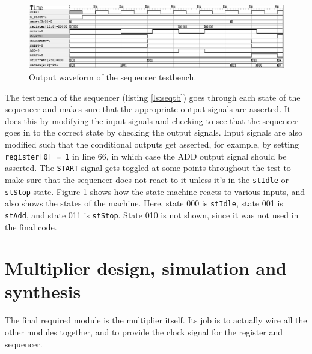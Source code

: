 \documentclass[a4paper,11pt]{article}
\begin{document}
\begin{figure}[H]
    \centering
        \includegraphics[scale=0.65]{../out/sequencer_tb.eps}
    \caption{Output waveform of the sequencer testbench.}
    \label{fig:seqtbw}
\end{figure}

The testbench of the sequencer (listing \ref{ls:seqtb}) goes through each state of the sequencer and makes sure that the appropriate output signals are asserted. It does this by modifying the input signals and checking to see that the sequencer goes in to the correct state by checking the output signals. Input signals are also modified such that the conditional outputs get asserted, for example, by setting \lstinline{register[0] = 1} in line 66, in which case the ADD output signal should be asserted. The \lstinline{START} signal gets toggled at some points throughout the test to make sure that the sequencer does not react to it unless it's in the \lstinline{stIdle} or \lstinline{stStop} state. Figure \ref{fig:seqtbw} shows how the state machine reacts to various inputs, and also shows the states of the machine. Here, state 000 is \lstinline{stIdle}, state 001 is \lstinline{stAdd}, and state 011 is \lstinline{stStop}. State 010 is not shown, since it was not used in the final code.

\section{Multiplier design, simulation and synthesis}

The final required module is the multiplier itself. Its job is to actually wire all the other modules together, and to provide the clock signal for the register and sequencer.
\end{document}

